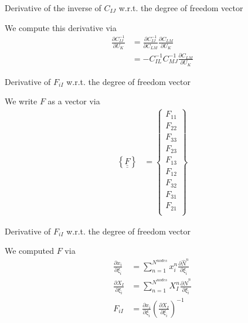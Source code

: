 \documentclass[11pt]{beamer}
\newcommand{\TEN}[1]{\underline{\underline{#1}}}
\begin{document}
\begin{frame}{Derivative of the inverse of $C_{IJ}$ w.r.t. the degree of freedom vector}

We compute this derivative via
\begin{align*}
\frac{\partial C_{IJ}^{-1}}{\partial U_K} &= \frac{\partial C_{IJ}^{-1}}{\partial C_{LM}}\frac{\partial C_{LM}}{\partial U_K}\\
&= -C_{IL}^{-1} C_{MJ}^{-1}\frac{\partial C_{LM}}{\partial U_K}
\end{align*}

\end{frame}

%
%
%

\begin{frame}{Derivative of $F_{iI}$ w.r.t. the degree of freedom vector}

We write $F$ as a vector via
\begin{align*}
\left\{\TEN{F}\right\} &= \left\{\begin{array}{c}
F_{11}\\
F_{22}\\
F_{33}\\
F_{23}\\
F_{13}\\
F_{12}\\
F_{32}\\
F_{31}\\
F_{21}\\
\end{array}\right\}
\end{align*}

\end{frame}

\begin{frame}{Derivative of $F_{iI}$ w.r.t. the degree of freedom vector}

We computed $F$ via
\begin{align*}
\frac{\partial x_i}{\partial \xi_{\hat{i}}} &= \sum_{n=1}^{N^{nodes}}x_i^n\frac{\partial \hat{N}^n}{\partial \xi_{\hat{i}}}\\
\frac{\partial X_I}{\partial \xi_{\hat{i}}} &= \sum_{n=1}^{N^{nodes}}X_I^n\frac{\partial \hat{N}^n}{\partial \xi_{\hat{i}}}\\
F_{iI} &= \frac{\partial x_i}{\partial \xi_{\hat{i}}} \left(\frac{\partial X_I}{\partial \xi_{\hat{i}}}\right)^{-1}\\
\end{align*}

\end{frame}
\end{document}
